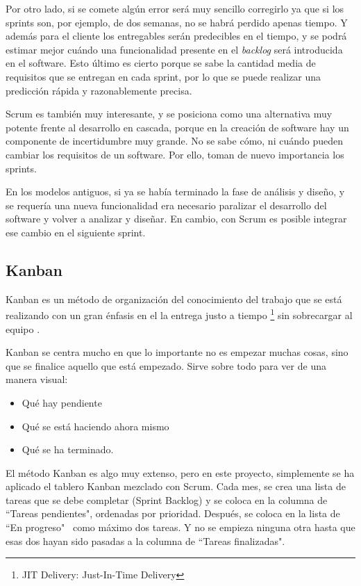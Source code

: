 Por otro lado, si se comete alg\'un error ser\'a muy sencillo corregirlo ya que si los sprints son, por ejemplo, de dos semanas, no 
se habr\'a perdido apenas tiempo. Y adem\'as para el cliente los entregables ser\'an predecibles en el tiempo, 
y se podr\'a estimar mejor cu\'ando una funcionalidad presente en el \emph{backlog}
ser\'a introducida en el software. Esto \'ultimo es cierto porque se sabe la cantidad media de requisitos que se
entregan en cada sprint, por lo que se puede realizar una predicci\'on r\'apida y razonablemente precisa.

Scrum es tambi\'en muy interesante, y se posiciona como una alternativa muy potente frente al
desarrollo en cascada, porque en la creaci\'on 
de software hay un componente de incertidumbre muy 
grande. No se sabe c\'omo, ni cu\'ando pueden cambiar los requisitos de un 
software. Por ello, toman de nuevo importancia los sprints. 

En los modelos antiguos, si ya se hab\'ia terminado la fase de an\'alisis y dise\~no, y se requer\'ia una nueva funcionalidad era necesario 
paralizar el desarrollo del software y volver a analizar y diseñar. En cambio, con Scrum es 
posible integrar ese cambio en el siguiente sprint.

\subsection{Kanban}
Kanban es un m\'etodo de organizaci\'on del conocimiento del trabajo que se est\'a realizando con un gran \'enfasis en el la entrega justo a 
tiempo \footnote{JIT Delivery: Just-In-Time Delivery} sin sobrecargar al equipo \cite{Kanban:WhatIsIt}.

Kanban se centra mucho en que lo importante no es empezar muchas cosas, sino que se finalice
aquello que est\'a empezado. Sirve sobre todo 
para ver de una manera visual:
\begin{itemize}
	\item Qu\'e hay pendiente
	\item Qu\'e se est\'a haciendo ahora mismo
	\item Qu\'e se ha terminado.
\end{itemize}

El m\'{e}todo Kanban es algo muy extenso, pero en este proyecto, simplemente se ha aplicado el tablero Kanban mezclado con Scrum. 
Cada mes, se crea una lista de tareas que se debe completar (Sprint Backlog) y se coloca en la columna de ``Tareas pendientes", 
ordenadas por prioridad. Despu\'es, se coloca en la lista de ``En progreso" \ como m\'{a}ximo dos tareas. Y no se empieza ninguna otra
hasta que esas dos hayan sido pasadas a la columna de ``Tareas finalizadas".

